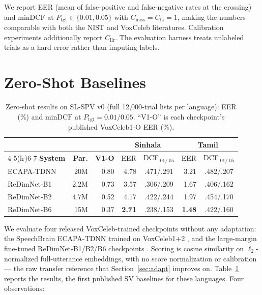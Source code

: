 \documentclass[journal]{IEEEtran}
\newcommand{\dcf}{\mathrm{minDCF}}
\newcommand{\cllr}{C_{\mathrm{llr}}}
\begin{document}
We report EER (mean of false-positive and false-negative rates at the
crossing) and $\dcf$ at $P_{\mathrm{tgt}} \in \{0.01, 0.05\}$ with
$C_{\mathrm{miss}}{=}C_{\mathrm{fa}}{=}1$, making the numbers
comparable with both the NIST and VoxCeleb literatures. Calibration
experiments additionally report $\cllr$. The evaluation harness
treats unlabeled trials as a hard error rather than imputing labels.

\section{Zero-Shot Baselines}
\label{sec:zeroshot}

\begin{table}[!t]
\renewcommand{\arraystretch}{1.12}
\caption{Zero-shot results on SL-SPV v0 (full 12{,}000-trial lists
per language): EER (\%) and $\dcf$ at $P_{\mathrm{tgt}}=0.01/0.05$.
``V1-O'' is each checkpoint's published VoxCeleb1-O EER (\%).}
\label{tab:zeroshot}
\centering
\footnotesize
\setlength{\tabcolsep}{2.6pt}
\begin{tabular}{l r r r c r c}
\toprule
& & & \multicolumn{2}{c}{\textbf{Sinhala}} & \multicolumn{2}{c}{\textbf{Tamil}} \\
\cmidrule(lr){4-5}\cmidrule(lr){6-7}
\textbf{System} & \textbf{Par.} & \textbf{V1-O} & EER & DCF$_{.01/.05}$ & EER & DCF$_{.01/.05}$ \\
\midrule
ECAPA-TDNN \cite{desplanques2020ecapa}  & 20M  & 0.80 & 4.78 & .471/.291 & 3.21 & .482/.207 \\
ReDimNet-B1 \cite{yakovlev2024redimnet} & 2.2M & 0.73 & 3.57 & .306/.209 & 1.67 & .406/.162 \\
ReDimNet-B2 \cite{yakovlev2024redimnet} & 4.7M & 0.52 & 4.17 & .422/.244 & 1.97 & .454/.170 \\
ReDimNet-B6 \cite{yakovlev2024redimnet} & 15M  & 0.37 & \textbf{2.71} & .238/.153 & \textbf{1.48} & .422/.160 \\
\bottomrule
\end{tabular}
\end{table}

We evaluate four released VoxCeleb-trained checkpoints without any
adaptation: the SpeechBrain ECAPA-TDNN \cite{desplanques2020ecapa,
ravanelli2021speechbrain} trained on VoxCeleb1+2
\cite{nagrani2017voxceleb, chung2018voxceleb2}, and the large-margin
fine-tuned ReDimNet-B1/B2/B6 checkpoints \cite{yakovlev2024redimnet}.
Scoring is cosine similarity on $\ell_2$-normalized full-utterance
embeddings, with no score normalization or calibration --- the raw
transfer reference that Section~\ref{sec:adapt} improves on.
Table~\ref{tab:zeroshot} reports the results, the first published SV
baselines for these languages. Four observations:
\end{document}

